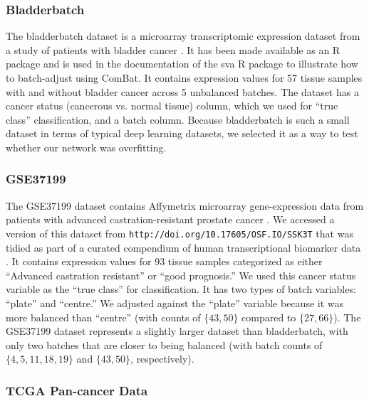 \documentclass[12pt]{article}
\begin{document}
\subsubsection{Bladderbatch}

The bladderbatch dataset is a microarray transcriptomic expression dataset from a study of patients with bladder cancer \cite{dyrskjot_gene_2004}.
It has been made available as an R package \cite{leek_bladderbatch_2017} and is used in the documentation of the sva R package \cite{leek_sva_2017} to illustrate how to batch-adjust using ComBat.
It contains expression values for 57 tissue samples with and without bladder cancer across 5 unbalanced batches.
The dataset has a cancer status (cancerous vs. normal tissue) column, which we used for ``true class'' classification, and a batch column.
Because bladderbatch is such a small dataset in terms of typical deep learning datasets, we selected it as a way to test whether our network was overfitting.

\subsubsection{GSE37199}

The GSE37199 dataset contains Affymetrix microarray gene-expression data from patients with advanced castration-resistant prostate cancer \cite{olmos_prognostic_2012}.
We accessed a version of this dataset from \nolinkurl{http://doi.org/10.17605/OSF.IO/SSK3T} that was tidied as part of a curated compendium of human transcriptional biomarker data \cite{golightly_curated_2018}.
It contains expression values for 93 tissue samples categorized as either ``Advanced castration resistant'' or ``good prognosis.''
We used this cancer status variable as the ``true class'' for classification.
It has two types of batch variables: ``plate'' and ``centre.''
We adjusted against the ``plate'' variable because it was more balanced than ``centre'' (with counts of $\{43, 50\}$ compared to $\{27, 66\}$).
The GSE37199 dataset represents a slightly larger dataset than bladderbatch, with only two batches that are closer to being balanced (with batch counts of $\{4, 5, 11, 18, 19\}$ and $\{43, 50\}$, respectively).

\subsubsection{TCGA Pan-cancer Data}
\end{document}
